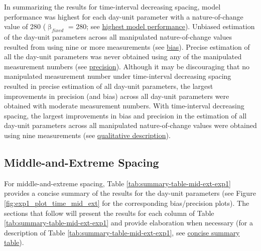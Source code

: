 \documentclass[
12pt, %
twoside,
english]{guelphthesis}
\begin{document}
In summarizing the results for time-interval decreasing spacing, model performance was highest for each day-unit parameter with a nature-of-change value of 280 (\(\upbeta_{fixed}\) = 280; see \protect\hyperlink{nature-change-time-dec-exp1}{highest model performance}). Unbiased estimation of the day-unit parameters across all manipulated nature-of-change values resulted from using nine or more measurements (see \protect\hyperlink{bias-time-dec-exp1}{bias}). Precise estimation of all the day-unit parameters was never obtained using any of the manipulated measurement numbers (see \protect\hyperlink{precision-time-dec-exp1}{precision}). Although it may be discouraging that no manipulated measurement number under time-interval decreasing spacing resulted in precise estimation of all day-unit parameters, the largest improvements in precision (and bias) across all day-unit parameters were obtained with moderate measurement numbers. With time-interval decreasing spacing, the largest improvements in bias and precision in the estimation of all day-unit parameters across all manipulated nature-of-change values were obtained using nine measurements (see \protect\hyperlink{qualitative-time-inc-exp1}{qualitative description}).

\hypertarget{middle-and-extreme-spacing}{%
\subsection{Middle-and-Extreme Spacing}\label{middle-and-extreme-spacing}}

For middle-and-extreme spacing, Table \ref{tab:summary-table-mid-ext-exp1} provides a concise summary of the results for the day-unit parameters (see Figure \ref{fig:exp1_plot_time_mid_ext} for the corresponding bias/precision plots). The sections that follow will present the results for each column of Table \ref{tab:summary-table-mid-ext-exp1} and provide elaboration when necessary (for a description of Table \ref{tab:summary-table-mid-ext-exp1}, see \protect\hyperlink{concise-tab}{concise summary table}).
\end{document}
